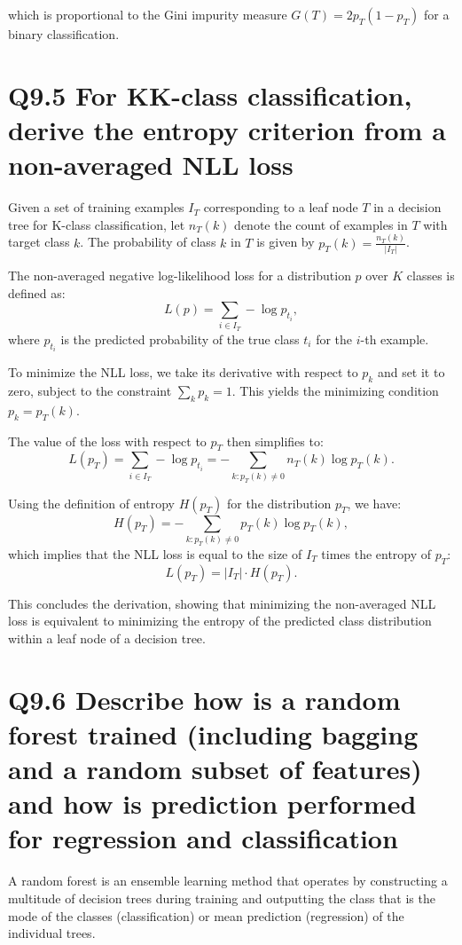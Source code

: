 \documentclass[11pt]{article}
\begin{document}
which is proportional to the Gini impurity measure \( G(T) = 2p_T(1 - p_T) \) for a binary classification.

\section{Q9.5 For KK-class classification, derive the entropy criterion from a non-averaged NLL loss}

Given a set of training examples \(I_T\) corresponding to a leaf node \(T\) in a decision tree for K-class classification, let \(n_T(k)\) denote the count of examples in \(T\) with target class \(k\). The probability of class \(k\) in \(T\) is given by \(p_T(k) = \frac{n_T(k)}{|I_T|}\).

The non-averaged negative log-likelihood loss for a distribution \(p\) over \(K\) classes is defined as:
\[
L(p) = \sum_{i \in I_T} -\log p_{t_i},
\]
where \(p_{t_i}\) is the predicted probability of the true class \(t_i\) for the \(i\)-th example.

To minimize the NLL loss, we take its derivative with respect to \(p_k\) and set it to zero, subject to the constraint \(\sum_k p_k = 1\). This yields the minimizing condition \(p_k = p_T(k)\).

The value of the loss with respect to \(p_T\) then simplifies to:
\[
L(p_T) = \sum_{i \in I_T} -\log p_{t_i} = -\sum_{k: p_T(k) \neq 0} n_T(k) \log p_T(k).
\]

Using the definition of entropy \(H(p_T)\) for the distribution \(p_T\), we have:
\[
H(p_T) = -\sum_{k: p_T(k) \neq 0} p_T(k) \log p_T(k),
\]
which implies that the NLL loss is equal to the size of \(I_T\) times the entropy of \(p_T\):
\[
L(p_T) = |I_T| \cdot H(p_T).
\]

This concludes the derivation, showing that minimizing the non-averaged NLL loss is equivalent to minimizing the entropy of the predicted class distribution within a leaf node of a decision tree.

\section{Q9.6 Describe how is a random forest trained (including bagging and a random subset of features) and how is prediction performed for regression and classification}

A random forest is an ensemble learning method that operates by constructing a multitude of decision trees during training and outputting the class that is the mode of the classes (classification) or mean prediction (regression) of the individual trees.
\end{document}
